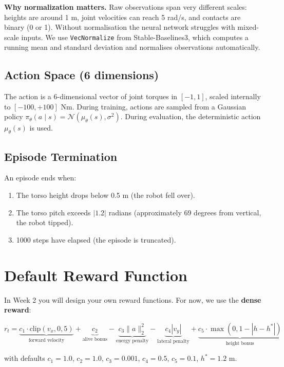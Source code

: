 \documentclass[12pt, a4paper]{article}
\begin{document}
\textbf{Why normalization matters.} Raw observations span very different scales: heights are around 1 m, joint velocities can reach 5 rad/s, and contacts are binary (0 or 1). Without normalisation the neural network struggles with mixed-scale inputs. We use \texttt{VecNormalize} from Stable-Baselines3, which computes a running mean and standard deviation and normalises observations automatically.

\subsection{Action Space (6 dimensions)}

The action is a 6-dimensional vector of joint torques in $[-1, 1]$, scaled internally to $[-100, +100]$ Nm. During training, actions are sampled from a Gaussian policy $\pi_\theta(a \mid s) = \mathcal{N}(\mu_\theta(s), \sigma^2)$. During evaluation, the deterministic action $\mu_\theta(s)$ is used.

\subsection{Episode Termination}

An episode ends when:
\begin{enumerate}
    \item The torso height drops below 0.5 m (the robot fell over).
    \item The torso pitch exceeds $|1.2|$ radians (approximately 69 degrees from vertical, the robot tipped).
    \item 1000 steps have elapsed (the episode is truncated).
\end{enumerate}

\section{Default Reward Function}

In Week 2 you will design your own reward functions. For now, we use the \textbf{dense reward}:

\[
r_t = \underbrace{c_1 \cdot \text{clip}(v_x, 0, 5)}_{\text{forward velocity}}
    + \underbrace{c_2}_{\text{alive bonus}}
    - \underbrace{c_3 \|a\|_2^2}_{\text{energy penalty}}
    - \underbrace{c_4 |v_y|}_{\text{lateral penalty}}
    + \underbrace{c_5 \cdot \max(0, 1 - |h - h^*|)}_{\text{height bonus}}
\]

with defaults $c_1 = 1.0$, $c_2 = 1.0$, $c_3 = 0.001$, $c_4 = 0.5$, $c_5 = 0.1$, $h^* = 1.2$ m.
\end{document}
